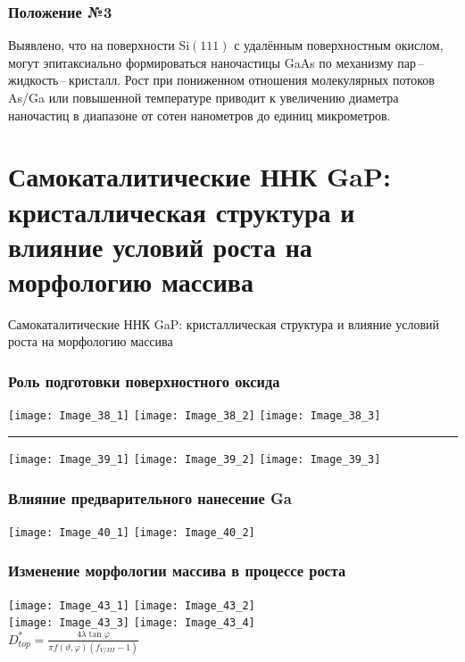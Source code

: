 \begin{frame}
	\frametitle{Положение №3}
	\large
Выявлено, что на поверхности Si\((111)\) с
удалённым поверхностным окислом, могут эпитаксиально формироваться наночастицы GaAs по механизму пар\,--\,жидкость\,--\,кристалл. Рост при пониженном
отношения молекулярных потоков As/Ga или повышенной температуре приводит к
увеличению диаметра наночастиц в диапазоне от сотен нанометров до единиц
микрометров.
\end{frame}

\section{Самокаталитические ННК GaP: кристаллическая структура и влияние условий роста на морфологию массива}

\begin{frame}
	\begin{center}
		\Huge
		Самокаталитические ННК GaP: кристаллическая структура и влияние условий роста на морфологию массива
	\end{center}
\end{frame}

\begin{frame}
	\frametitle{Роль подготовки поверхностного оксида}
	\centering
	\hfill
	\texttt{[image: Image\_38\_1]}
	\hfill
	\texttt{[image: Image\_38\_2]}
	\hfill
	\texttt{[image: Image\_38\_3]}
	\hfill
	\bigskip
	\hrule{}
	\bigskip
	\hfill
	\texttt{[image: Image\_39\_1]}
	\hfill
	\texttt{[image: Image\_39\_2]}
	\hfill
	\texttt{[image: Image\_39\_3]}
	\hfill
\end{frame}

\begin{frame}
	\frametitle{Влияние предварительного нанесение Ga}
	\centering
	\texttt{[image: Image\_40\_1]}
	\texttt{[image: Image\_40\_2]}
\end{frame}


\begin{frame}
	\frametitle{Изменение морфологии массива в процессе роста}
	\centering
	\texttt{[image: Image\_43\_1]}
	\texttt{[image: Image\_43\_2]}
	\\
	\texttt{[image: Image\_43\_3]}
	\texttt{[image: Image\_43\_4]}
	\\[5pt]
	\(D_{top}^\ast=\frac{4 \lambda \tan{\varphi}}{\pi f(\vartheta,\varphi)(f_{V/III}-1)}\)
\end{frame}


